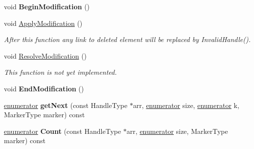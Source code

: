 \begin{DoxyCompactItemize}
\item 
\hypertarget{classINMOST_1_1Mesh_aef0c0ff2608666651ef66adc1c143352}{void {\bfseries Begin\-Modification} ()}\label{classINMOST_1_1Mesh_aef0c0ff2608666651ef66adc1c143352}

\item 
void \hyperlink{classINMOST_1_1Mesh_a1f53070855f3503b2f4cefc16cedd6a0}{Apply\-Modification} ()
\begin{DoxyCompactList}\small\item\em After this function any link to deleted element will be replaced by Invalid\-Handle(). \end{DoxyCompactList}\item 
void \hyperlink{classINMOST_1_1Mesh_a60274817b98e76ec5a411f0c3df2a76b}{Resolve\-Modification} ()
\begin{DoxyCompactList}\small\item\em This function is not yet implemented. \end{DoxyCompactList}\item 
\hypertarget{classINMOST_1_1Mesh_ac1dacf6bdaf0654c5a2ad5d2d6e57966}{void {\bfseries End\-Modification} ()}\label{classINMOST_1_1Mesh_ac1dacf6bdaf0654c5a2ad5d2d6e57966}

\item 
\hypertarget{classINMOST_1_1Mesh_a9c61eda9492c7167ec7c02ac1ba50ebc}{\hyperlink{classINMOST_1_1Storage_ae333dfced6fa9cfde0c8e7dcf1b0cc2b}{enumerator} {\bfseries get\-Next} (const Handle\-Type $\ast$arr, \hyperlink{classINMOST_1_1Storage_ae333dfced6fa9cfde0c8e7dcf1b0cc2b}{enumerator} size, \hyperlink{classINMOST_1_1Storage_ae333dfced6fa9cfde0c8e7dcf1b0cc2b}{enumerator} k, Marker\-Type marker) const }\label{classINMOST_1_1Mesh_a9c61eda9492c7167ec7c02ac1ba50ebc}

\item 
\hypertarget{classINMOST_1_1Mesh_a819d63c1a65ceaa138bdb8131e2fc97d}{\hyperlink{classINMOST_1_1Storage_ae333dfced6fa9cfde0c8e7dcf1b0cc2b}{enumerator} {\bfseries Count} (const Handle\-Type $\ast$arr, \hyperlink{classINMOST_1_1Storage_ae333dfced6fa9cfde0c8e7dcf1b0cc2b}{enumerator} size, Marker\-Type marker) const }\label{classINMOST_1_1Mesh_a819d63c1a65ceaa138bdb8131e2fc97d}


\end{DoxyCompactItemize}
